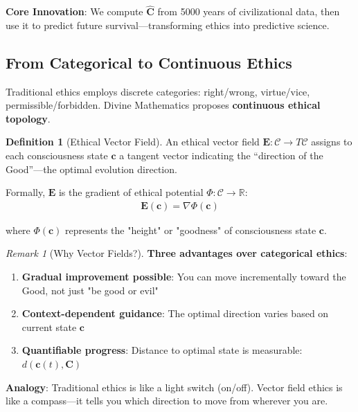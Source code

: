 \documentclass[11pt,a4paper]{article}
\theoremstyle{definition}
\newtheorem{definition}{Definition}[section]
\theoremstyle{remark}
\newtheorem{remark}{Remark}[section]
\newcommand{\RR}{\mathbb{R}}
\newcommand{\CC}{\mathcal{C}}
\newcommand{\EE}{\mathbf{E}}
\newcommand{\cc}{\mathbf{c}}
\begin{document}
\begin{small}
\begin{mdframed}[backgroundcolor=cyan!5,linewidth=2pt]
\textbf{Core Innovation}: We compute \(\hat{\mathbf{C}}\) from 5000 years of civilizational data, then use it to predict future survival—transforming ethics into predictive science.
\end{mdframed}

\subsection{From Categorical to Continuous Ethics}

Traditional ethics employs discrete categories: right/wrong, virtue/vice, permissible/forbidden. Divine Mathematics proposes \textbf{continuous ethical topology}.

\begin{definition}[Ethical Vector Field]
An ethical vector field \(\EE: \CC \to T\CC\) assigns to each consciousness state \(\cc\) a tangent vector indicating the ``direction of the Good''—the optimal evolution direction.

Formally, \(\EE\) is the gradient of ethical potential \(\Phi: \CC \to \RR\):
\begin{align}
\EE(\cc) = \nabla \Phi(\cc)
\end{align}

where \(\Phi(\cc)\) represents the "height" or "goodness" of consciousness state \(\cc\).
\end{definition}

\begin{remark}[Why Vector Fields?]
\textbf{Three advantages over categorical ethics}:

\begin{enumerate}
    \item \textbf{Gradual improvement possible}: You can move incrementally toward the Good, not just "be good or evil"
    \item \textbf{Context-dependent guidance}: The optimal direction varies based on current state \(\cc\)
    \item \textbf{Quantifiable progress}: Distance to optimal state is measurable: \(d(\cc(t), \mathbf{C})\)
\end{enumerate}

\textbf{Analogy}: Traditional ethics is like a light switch (on/off). Vector field ethics is like a compass—it tells you which direction to move from wherever you are.
\end{remark}

\begin{figure}[H]
\centering
{}
\end{figure}
\end{small}
\end{document}
